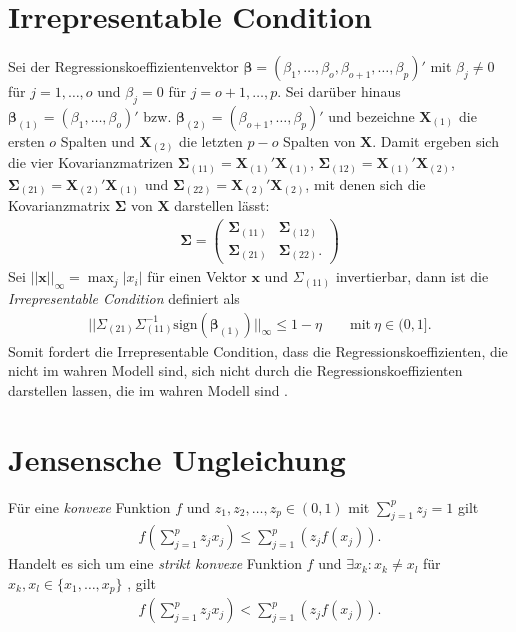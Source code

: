 \documentclass[12pt, a4paper]{report}\usepackage[]{graphicx}\usepackage[]{color}
\begin{document}
\begin{appendix}
\section{Irrepresentable Condition}\label{App_Irrepresentable Condition}
Sei der Regressionskoeffizientenvektor $\boldsymbol{\beta}=(\beta_1, \dots, \beta_o, \beta_{o+1}, \dots, \beta_p)'$ mit $\beta_j \neq 0$ für $j=1,\dots,o$ und $\beta_j = 0$ für $j=o+1, \dots, p$. Sei darüber hinaus $\boldsymbol{\beta}_{(1)}=(\beta_1, \dots, \beta_o)'$ bzw. $\boldsymbol{\beta}_{(2)}=(\beta_{o+1}, \dots, \beta_p)'$ und bezeichne $\mathbf{X}_{(1)}$ die ersten $o$ Spalten und $\mathbf{X}_{(2)}$ die letzten $p-o$ Spalten von $\mathbf{X}$. Damit ergeben sich die vier Kovarianzmatrizen $\boldsymbol{\Sigma}_{(11)}=\mathbf{X}_{(1)}'\mathbf{X}_{(1)}$, $\boldsymbol{\Sigma}_{(12)}=\mathbf{X}_{(1)}'\mathbf{X}_{(2)}$, $\boldsymbol{\Sigma}_{(21)}=\mathbf{X}_{(2)}'\mathbf{X}_{(1)}$ und $\boldsymbol{\Sigma}_{(22)}=\mathbf{X}_{(2)}'\mathbf{X}_{(2)}$, mit denen sich die Kovarianzmatrix $\boldsymbol{\Sigma}$ von $\mathbf{X}$ darstellen lässt:
\begin{align*}
\boldsymbol{\Sigma} = 
\begin{pmatrix}
\boldsymbol{\Sigma}_{(11)} & \boldsymbol{\Sigma}_{(12)} \\
\boldsymbol{\Sigma}_{(21)} & \boldsymbol{\Sigma}_{(22)}.
\end{pmatrix}
\end{align*}
Sei $||\mathbf{x}||_{\infty}=\max_j|x_i|$ für einen Vektor $\mathbf{x}$ und $\Sigma_{(11)}$ invertierbar, dann ist die \textit{Irrepresentable Condition} definiert als
\begin{align*}
||\Sigma_{(21)}\Sigma_{(11)}^{-1} \text{sign}(\boldsymbol{\beta}_{(1)})||_{\infty}\leq 1-\eta \qquad \text{mit} \ \eta \in (0,1].
\end{align*}
Somit fordert die Irrepresentable Condition, dass die Regressionskoeffizienten, die nicht im wahren Modell sind, sich nicht durch die Regressionskoeffizienten darstellen lassen, die im wahren Modell sind \cite{Zhao2006Lasso_Consistency}.

\section{Jensensche Ungleichung}\label{App_Jensensche_Ungleichung}
Für eine \textit{konvexe} Funktion $f$ und $z_1,z_2, \dots,z_p \in (0,1)$ mit $\sum_{j=1}^{p}z_j =1$ gilt 
\begin{align*}
f \left(\sum_{j=1}^{p} z_j x_j \right) \leq \sum_{j=1}^{p} \left( z_j f(x_j) \right).
\end{align*}
Handelt es sich um eine \textit{strikt konvexe} Funktion $f$ und $\exists x_k : x_k \neq x_l$ für $x_k,x_l \in \{x_1, \dots, x_p\}$  \cite{Mitroi2010Precision_Jensen}, gilt
\begin{align*}
f \left(\sum_{j=1}^{p} z_j x_j \right) < \sum_{j=1}^{p} \left( z_j f(x_j) \right).
\end{align*}


\end{appendix}
\end{document}
